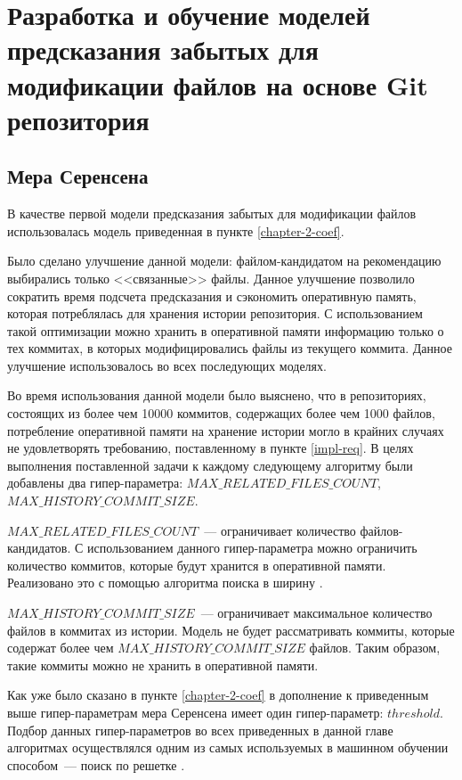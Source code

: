 \section{Разработка и обучение моделей предсказания забытых для модификации файлов на основе Git репозитория}
    \subsection{Мера Серенсена}\label{chapter3-coef}
В качестве первой модели предсказания забытых для модификации файлов использовалась модель приведенная в пункте \ref{chapter-2-coef}. 

Было сделано улучшение данной модели: файлом-кандидатом на рекомендацию выбирались только <<связанные>> файлы. Данное улучшение позволило сократить время подсчета предсказания и сэкономить оперативную память, которая потреблялась для хранения истории репозитория. С использованием такой оптимизации можно хранить в оперативной памяти информацию только о тех коммитах, в которых модифицировались файлы из текущего коммита. Данное улучшение использовалось во всех последующих моделях.

Во время использования данной модели было выяснено, что в репозиториях, состоящих из более чем 10000 коммитов, содержащих более чем 1000 файлов, потребление оперативной памяти на хранение истории могло в крайних случаях не удовлетворять требованию, поставленному в пункте \ref{impl-req}. В целях выполнения поставленной задачи к каждому следующему алгоритму были добавлены два гипер-параметра: $MAX\_RELATED\_FILES\_COUNT$, $MAX\_HISTORY\_COMMIT\_SIZE$. 

$MAX\_RELATED\_FILES\_COUNT$~--- ограничивает количество файлов-кандидатов. С использованием данного гипер-параметра можно ограничить количество коммитов, которые будут хранится в оперативной памяти. Реализовано это с помощью алгоритма поиска в ширину \cite{alghorithms}.

$MAX\_HISTORY\_COMMIT\_SIZE$~--- ограничивает максимальное количество файлов в коммитах из истории. Модель не будет рассматривать коммиты, которые содержат более чем $MAX\_HISTORY\_COMMIT\_SIZE$ файлов. Таким образом, такие коммиты можно не хранить в оперативной памяти.

Как уже было сказано в пункте \ref{chapter-2-coef} в дополнение к приведенным выше гипер-параметрам мера Серенсена имеет один гипер-параметр: $threshold$. Подбор данных гипер-параметров во всех приведенных в данной главе алгоритмах осуществлялся одним из самых используемых в машинном обучении способом~--- поиск по решетке \cite{claesen2015hyperparameter}.

